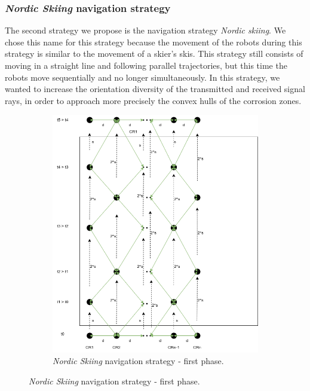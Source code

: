 \documentclass[english,RandD]{rapportPFE}  %
\begin{document}
			\subsubsection*{\textit{Nordic Skiing} navigation strategy}
				The second strategy we propose is the navigation strategy \textit{Nordic skiing}.
				We chose this name for this strategy because the movement of the robots during this strategy is similar to the movement of a skier's skis.
				This strategy still consists of moving in a straight line and following parallel trajectories, but this time the robots move sequentially and no longer simultaneously.
				In this strategy, we wanted to increase the orientation diversity of the transmitted and received signal rays, in order to approach more precisely the convex hulls of the corrosion zones.

				\begin{figure}[h!]
					\centering
					\begin{subfigure}[t]{0.45\linewidth}
						\centering
						\includegraphics[width=\linewidth]{graphics/ski_nordique_1.png}
						\caption{\textit{Nordic Skiing} navigation strategy - first phase.}
						\label{fig:ski_nordique_1}

\end{subfigure}
\end{figure}
\end{document}
